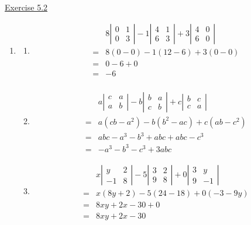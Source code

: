 \underline{Exercise 5.2}

\begin{enumerate}
\item 
\begin{enumerate}
\item[(c)] \[
\begin{aligned}
& 8\left|\begin{array}{ll}
0 & 1 \\
0 & 3
\end{array}\right|-1\left|\begin{array}{ll}
4 & 1 \\
6 & 3
\end{array}\right|+3\left|\begin{array}{ll}
4 & 0 \\
6 & 0
\end{array}\right| \\
=& 8(0-0)-1(12-6)+3(0-0) \\
=& 0-6+0 \\
= &-6 \\
\end{aligned}
\]

\item[(e)] \[
\begin{aligned}
& a\left|\begin{array}{ll}
c & a \\
a & b
\end{array}\right|-b\left|\begin{array}{cc}
b & a \\
c & b
\end{array}\right|+c\left|\begin{array}{cc}
b & c \\
c & a
\end{array}\right| \\
=& a\left(c b-a^{2}\right)-b\left(b^{2}-a c\right)+c\left(a b-c^{2}\right) \\
=& a b c-a^{3}-b^{3}+a b c+a b c-c^{3} \\
=&-a^{3}-b^{3}-c^{3}+3 a b c
\end{aligned}
\]

\item[(f)] \[
\begin{aligned}
& x\left|\begin{array}{cc}
y & 2 \\
-1 & 8
\end{array}\right|-5\left|\begin{array}{cc}
3 & 2 \\
9 & 8
\end{array}\right|+0\left|\begin{array}{rr}
3 & y \\
9 & -1
\end{array}\right| \\
=& x(8 y+2)-5(24-18)+0(-3-9 y) \\
=& 8 x y+2 x-30+0 \\
=& 8 x y+2 x-30
\end{aligned}
\]
\end{enumerate}


\end{enumerate}
